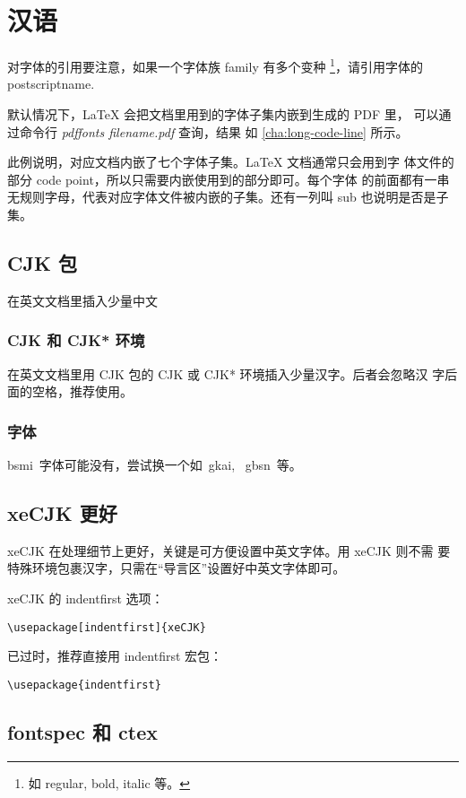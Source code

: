 \chapter{汉语}
\label{cha:inputChinese}

对字体的引用要注意，如果一个字体族 family 有多个变种 \footnote{如
  regular, bold, italic 等。}，请引用字体的 postscriptname.

默认情况下，\LaTeX{} 会把文档里用到的字体子集内嵌到生成的 PDF 里，
可以通过命令行 \textit{pdffonts filename.pdf} 查询，结果
如 \ref{cha:long-code-line} 所示。

此例说明，对应文档内嵌了七个字体子集。\LaTeX{} 文档通常只会用到字
体文件的部分 code point，所以只需要内嵌使用到的部分即可。每个字体
的前面都有一串无规则字母，代表对应字体文件被内嵌的子集。还有一列叫
sub 也说明是否是子集。

\section{CJK 包}

在英文文档里插入少量中文

\subsection{CJK 和 CJK* 环境}
在英文文档里用 CJK 包的 CJK 或 CJK* 环境插入少量汉字。后者会忽略汉
字后面的空格，推荐使用。

\subsection{字体}
bsmi~字体可能没有，尝试换一个如~gkai, ~gbsn~等。

\section{xeCJK 更好}
xeCJK 在处理细节上更好，关键是可方便设置中英文字体。用 xeCJK 则不需
要特殊环境包裹汉字，只需在``导言区''设置好中英文字体即可。

xeCJK 的 indentfirst 选项：
\begin{center}
  \verb|\usepackage[indentfirst]{xeCJK}|
\end{center}
已过时，推荐直接用 indentfirst 宏包：
\begin{center}
  \verb|\usepackage{indentfirst}|
\end{center}

\section{fontspec 和 ctex}
\label{sec:fontspec-ctex}

